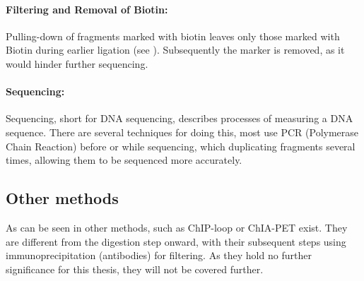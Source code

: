 \paragraph{Filtering and Removal of Biotin:}\label{sec:pulldown}
Pulling-down of fragments marked with biotin leaves only those marked with
Biotin during earlier ligation (see ). Subsequently the
marker is removed, as it would hinder further sequencing.


\paragraph{Sequencing:}\label{sec:sequencing}
Sequencing, short for DNA sequencing, describes processes of measuring a DNA
sequence. There are several techniques for doing this, most use PCR (Polymerase
Chain Reaction) before or while sequencing, which duplicating fragments
several times, allowing them to be sequenced more accurately.







\subsection{Other methods}\label{sec:other3c}

As can be seen in  other methods, such as ChIP-loop or ChIA-PET
exist. They are different from the digestion step onward, with their
subsequent steps using immunoprecipitation (antibodies) for filtering. As they
hold no further significance for this thesis, they will not be covered further.


